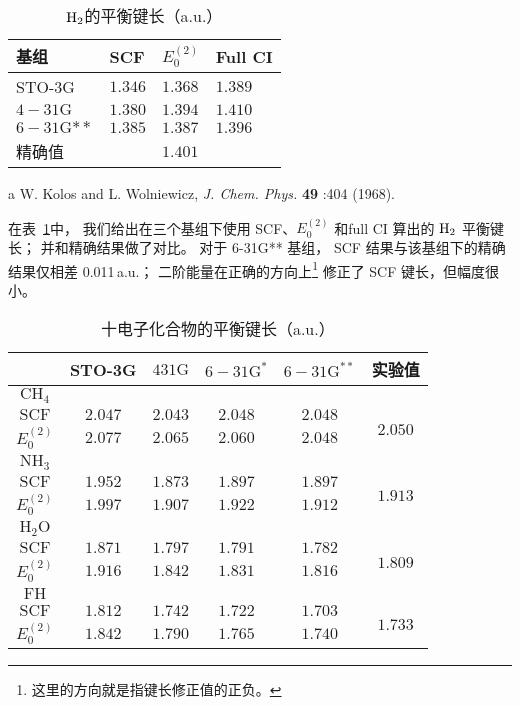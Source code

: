 \begin{table}[H]
	\centering
	\caption{$\mathrm{H}_2$的平衡键长（a.u.）}
	\begin{threeparttable}
		\begin{tabular}{llll}
			\hline 基组 & SCF & $E_0^{(2)}$ & Full CI \\
			\hline STO-3G & $1.346$ & $1.368$ & $1.389$ \\
			$4-31 \mathrm{G}$ & $1.380$ & $1.394$ & $1.410$ \\
			$6-31 \mathrm{G}{**}$ & $1.385$ & $1.387$ & $1.396$ \\
			\hline 精确值\tnote{a} & & $1.401$ & \\
			\hline
		\end{tabular}
		\begin{tablenotes}
			\item[a] W. Kolos and L. Wolniewicz, \textit{J. Chem. Phys.} \textbf{49} :404 (1968).
		\end{tablenotes}
	\end{threeparttable}
\label{tab:6.4}
\end{table}
在表~\ref{tab:6.4}中，
我们给出在三个基组下使用 SCF、$E_0^{(2)}$ 和full CI 算出的 $\mathrm{H}_2$ 平衡键长；
并和精确结果做了对比。 
对于 6-31G** 基组，
SCF 结果与该基组下的精确结果仅相差 0.011\,a.u.；
二阶能量在正确的方向上\footnote{这里的方向就是指键长修正值的正负。}
修正了 SCF 键长，但幅度很小。

\begin{table}
	\centering
	\caption{十电子化合物的平衡键长（a.u.）}
	\begin{tabular}{cccccc}
		\hline & STO-3G & $431 \mathrm{G}$ & $6-31 \mathrm{G}^*$ & $6-31 \mathrm{G}^{* *}$ & 实验值 \\
		\hline
		$\mathrm{CH}_4$ & & & & & \\
		$\mathrm{SCF}$ & $2.047$ & $2.043$ & $2.048$ & $2.048$ & \multirow{2}{*}{$2.050$}\\
		$E_0^{(2)}$ & $2.077$ & $2.065$ & $2.060$ & $2.048$ & \\
		$\mathrm{NH}_3$ & & & & & \\
		$\mathrm{SCF}$ & $1.952$ & $1.873$ & $1.897$ & $1.897$ & \multirow{2}{*}{$1.913$}\\
		$E_0^{(2)}$ & $1.997$ & $1.907$ & $1.922$ & $1.912$ &  \\
		$\mathrm{H}_2 \mathrm{O}$ & & & & & \\
		$\mathrm{SCF}$ & $1.871$ & $1.797$ & $1.791$ & $1.782$ & \multirow{2}{*}{$1.809$}\\
		$E_0^{(2)}$ & $1.916$ & $1.842$ &  $1.831$ & $1.816$ & \\
		$\mathrm{FH}$ & & & & & \\ 
		$\mathrm{SCF}$ & $1.812$ & $1.742$ & $1.722$ & $1.703$ & \multirow{2}{*}{$1.733$}\\
		$E_0^{(2)}$ & $1.842$ & $1.790$ & $1.765$ & $1.740$ & \\ \hline
	\end{tabular}
	\label{tab:6.5}
\end{table}

